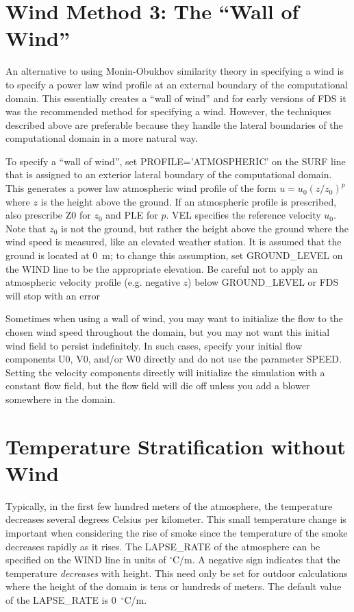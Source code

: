 \documentclass[11pt]{book}
\begin{document}
\section{Wind Method 3: The ``Wall of Wind''}
\label{info:wall_of_wind}

An alternative to using Monin-Obukhov similarity theory in specifying a wind is to specify a power law wind profile at an external boundary of the computational domain. This essentially creates a ``wall of wind'' and for early versions of FDS it was the recommended method for specifying a wind. However, the techniques described above are preferable because they handle the lateral boundaries of the computational domain in a more natural way.

To specify a ``wall of wind'', set {\ct PROFILE='ATMOSPHERIC'} on the {\ct SURF} line that is assigned to an exterior lateral boundary of the computational domain. This generates a power law atmospheric wind profile of the form $u=u_0 (z/z_0)^p$ where $z$ is the height above the ground. If an atmospheric profile is prescribed, also prescribe {\ct Z0} for $z_0$  and {\ct PLE} for $p$. {\ct VEL} specifies the reference velocity $u_0$. Note that $z_0$ is not the ground, but rather the height above the ground where the wind speed is measured, like an elevated weather station. It is assumed that the ground is located at 0~m; to change this assumption, set {\ct GROUND\_LEVEL} on the {\ct WIND} line to be the appropriate elevation. Be careful not to apply an atmospheric velocity profile (e.g. negative $z$) below {\ct GROUND\_LEVEL} or FDS will stop with an error

Sometimes when using a wall of wind, you may want to initialize the flow to the chosen wind speed throughout the domain, but you may not want this initial wind field to persist indefinitely. In such cases, specify your initial flow components {\ct U0}, {\ct V0}, and/or {\ct W0} directly and do not use the parameter {\ct SPEED}. Setting the velocity components directly will initialize the simulation with a constant flow field, but the flow field will die off unless you add a blower somewhere in the domain.





\section{Temperature Stratification without Wind}
\label{info:stratification}

Typically, in the first few hundred meters of the atmosphere, the temperature decreases several degrees Celsius per kilometer. This small temperature change is important when considering the rise of smoke since the temperature of the smoke decreases rapidly as it rises. The {\ct LAPSE\_RATE} of the atmosphere can be specified on the {\ct WIND} line in units of $^\circ$C/m. A negative sign indicates that the temperature {\em decreases} with height. This need only be set for outdoor calculations where the height of the domain is tens or hundreds of meters. The default value of the {\ct LAPSE\_RATE} is 0~$^\circ$C/m.
\end{document}
